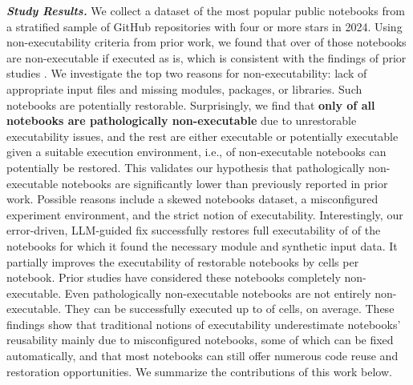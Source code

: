 \noindent\textbf{\emph{Study Results.}} We collect a dataset of the most popular \totalNotebooksInDataset public notebooks from a stratified sample of \totalRepos GitHub repositories with four or more stars in 2024. Using non-executability criteria from prior work, we found that over \percentNonExecutable of those notebooks are non-executable if executed as is, which is consistent with the findings of prior studies \cite{Pimentel2021, Wang2021}. 
%
We investigate the top two reasons for non-executability: lack of appropriate input files and missing modules, packages, or libraries. Such notebooks are potentially restorable. Surprisingly, we find that {\bf only \percentPathological of all notebooks are pathologically non-executable} due to unrestorable executability issues, and the rest are either executable or potentially executable given a suitable execution environment, i.e., \percentRestorableInNonExecutable of non-executable notebooks can potentially be restored. This validates our hypothesis that pathologically non-executable notebooks are significantly lower than previously reported in prior work. Possible reasons include a skewed notebooks dataset, a misconfigured experiment environment, and the strict notion of executability. 
%
Interestingly, our error-driven, LLM-guided fix successfully restores full executability of \totalFinalRestored of the notebooks for which it found the necessary module and synthetic input data. It partially improves the executability of restorable notebooks by \averageIncreasePartiallyRestored cells per notebook. Prior studies \cite{Pimentel2019, Pimentel2021} have considered these notebooks completely non-executable. 
%
Even pathologically non-executable notebooks are not entirely non-executable. They can be successfully executed up to \averagePercentPartialPathological of cells, on average. These findings show that traditional notions of executability underestimate notebooks' reusability mainly due to misconfigured notebooks, some of which can be fixed automatically, and that most notebooks can still offer numerous code reuse and restoration opportunities. We summarize the contributions of this work below. 


